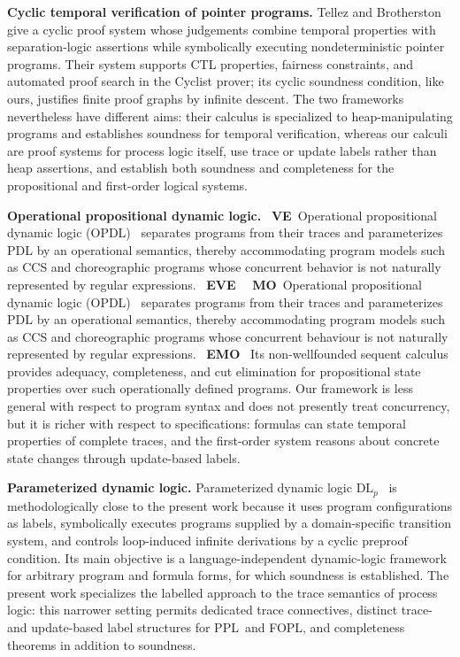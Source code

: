 \documentclass[manuscript,screen]{acmart}
\newcommand{\PPL}[0]{\mbox{PPL}}
\newcommand{\FOPL}[0]{\mbox{FOPL}}
\newcommand{\A}[1]{\mbox{ \textbf{#1} }}
\newcommand{\MO}{\A{MO}}
\newcommand{\EMO}{\A{EMO}}
\newcommand{\VE}{\A{VE}}
\newcommand{\EVE}{\A{EVE}}
\begin{document}
\textbf{Cyclic temporal verification of pointer programs.}
Tellez and Brotherston~\cite{Gadi20} give a cyclic proof system whose judgements combine temporal properties with separation-logic assertions while symbolically executing nondeterministic pointer programs.
Their system supports CTL properties, fairness constraints, and automated proof search in the Cyclist prover; its cyclic soundness condition, like ours, justifies finite proof graphs by infinite descent.
The two frameworks nevertheless have different aims: their calculus is specialized to heap-manipulating programs and establishes soundness for temporal verification, whereas our calculi are proof systems for process logic itself, use trace or update labels rather than heap assertions, and establish both soundness and completeness for the propositional and first-order logical systems.

\textbf{Operational propositional dynamic logic.}
\VE Operational propositional dynamic logic (OPDL)~\cite{Acclavio2024-uv} separates programs from their traces and parameterizes PDL by an operational semantics, thereby accommodating program models such as CCS and choreographic programs whose concurrent behavior is not naturally represented by regular expressions. \EVE
\MO Operational propositional dynamic logic (OPDL)~\cite{Acclavio2024-uv} separates programs from their traces and parameterizes PDL by an operational semantics, thereby accommodating program models such as CCS and choreographic programs whose concurrent behaviour is not naturally represented by regular expressions. \EMO
Its non-wellfounded sequent calculus provides adequacy, completeness, and cut elimination for propositional state properties over such operationally defined programs.
Our framework is less general with respect to program syntax and does not presently treat concurrency, but it is richer with respect to specifications: formulas can state temporal properties of complete traces, and the first-order system reasons about concrete state changes through update-based labels.

\textbf{Parameterized dynamic logic.}
Parameterized dynamic logic $\mathrm{DL}_{p}$~\cite{zhang2025parameterizeddynamiclogic} is methodologically close to the present work because it uses program configurations as labels, symbolically executes programs supplied by a domain-specific transition system, and controls loop-induced infinite derivations by a cyclic preproof condition.
Its main objective is a language-independent dynamic-logic framework for arbitrary program and formula forms, for which soundness is established.
The present work specializes the labelled approach to the trace semantics of process logic: this narrower setting permits dedicated trace connectives, distinct trace- and update-based label structures for \PPL\ and \FOPL, and completeness theorems in addition to soundness.
\fi
\end{document}
